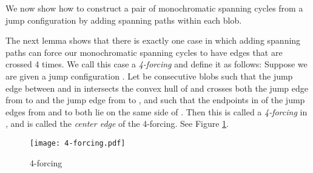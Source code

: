 \documentclass[12pt]{article}
\theoremstyle{definition}
\begin{document}
We now show how to construct a pair of monochromatic spanning cycles from a jump configuration by adding spanning paths within each blob.

The next lemma shows that there is exactly one case in which adding spanning paths can force our monochromatic spanning cycles to have edges that are crossed 4 times. We call this case a \emph{4-forcing} and define it as follows:
Suppose we are given a jump configuration . Let  be consecutive blobs such that the jump edge  between  and  in  intersects the convex hull of  and crosses both the jump edge from  to  and the jump edge from  to , and such that the endpoints in  of the jump edges from  and to  both lie on the same side of .
Then this is called a \emph{4-forcing} in , and  is called the \emph{center edge} of the 4-forcing.
See Figure \ref{fig:4-forcing}.

\begin{figure}[h]
\centering
\texttt{[image: 4-forcing.pdf]}
\caption{4-forcing}
\label{fig:4-forcing}
\end{figure}
\end{document}
